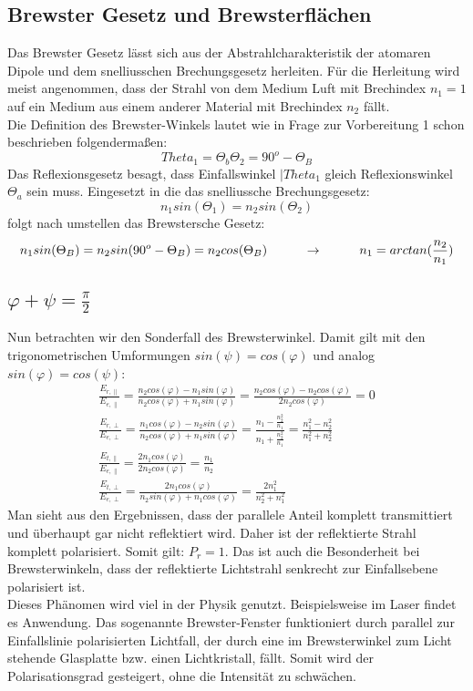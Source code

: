 \subsection*{Brewster Gesetz und Brewsterflächen}
Das Brewster Gesetz lässt sich aus der Abstrahlcharakteristik der atomaren Dipole und dem snelliusschen Brechungsgesetz herleiten. Für die Herleitung wird meist angenommen, dass der  Strahl von dem Medium Luft mit Brechindex $n_1=1$ auf ein Medium aus einem anderer Material mit Brechindex $n_2$ fällt.\\
Die Definition des Brewster-Winkels lautet wie in Frage zur Vorbereitung 1 schon beschrieben folgendermaßen:
\begin{equation}
Theta_1=\Theta_b\Theta_2=90^o-\Theta_B
\end{equation}
Das Reflexionsgesetz besagt, dass Einfallswinkel $|Theta_1$ gleich Reflexionswinkel $\Theta_a$ sein muss. 
Eingesetzt in die das snelliussche Brechungsgesetz: 
\begin{equation}
n_1sin(\Theta_1)=n_2sin(\Theta_2)
\end{equation}
folgt nach umstellen das Brewstersche Gesetz:
\begin{equation}
n_1sin(\Theta_B)=n_2sin(90^o-\Theta_B)=n_2cos(\Theta_B) \tab \rightarrow \tab n_1=arctan(\frac{n_2}{n_1})
\end{equation}

\subsection*{$\varphi+\psi=\frac{\pi}{2}$}
Nun betrachten wir den Sonderfall des Brewsterwinkel. Damit gilt mit den trigonometrischen Umformungen $sin(\psi)=cos(\varphi)$ und analog $sin(\varphi)=cos(\psi)$:
\begin{align*}
\frac{E_{r,\parallel}}{E_{e,\parallel}}=\frac{n_2cos(\varphi)-n_1sin(\varphi)}{n_2cos(\varphi)+n_1sin(\varphi)}= \frac{n_2cos(\varphi)-n_2cos(\varphi)}{2n_2cos(\varphi)}=0\\
\frac{E_{r,\perp}}{E_{e,\perp}}=\frac{n_1cos(\varphi)-n_2sin(\varphi)}{n_2cos(\varphi)+n_1sin(\varphi)}=\frac{n_1-\frac{n_2^2}{n_1}}{n_1+\frac{n_2^2}{n_1}}=\frac{n_1^2-n_2^2}{n_1^2+n_2^2}\\
\frac{E_{t,\parallel}}{E_{e,\parallel}}=\frac{2n_1cos(\varphi)}{2n_2cos(\varphi)}=\frac{n_1}{n_2}\\
\frac{E_{t,\perp}}{E_{e,\perp}}=\frac{2n_1cos(\varphi)}{n_2sin(\varphi)+n_1cos(\varphi)}=\frac{2n^2_1}{n_2^2+n_1^2}
\end{align*}
Man sieht aus den Ergebnissen, dass der parallele Anteil komplett transmittiert und überhaupt gar nicht reflektiert wird. Daher ist der reflektierte Strahl komplett polarisiert. Somit gilt: $P_r=1$. Das ist auch die Besonderheit bei Brewsterwinkeln, dass der reflektierte Lichtstrahl senkrecht zur Einfallsebene polarisiert ist. \\
Dieses Phänomen wird viel in der Physik genutzt. Beispielsweise im Laser findet es Anwendung. Das sogenannte Brewster-Fenster funktioniert durch parallel zur Einfallslinie polarisierten Lichtfall, der durch eine im Brewsterwinkel zum Licht stehende Glasplatte bzw. einen Lichtkristall, fällt. Somit wird der Polarisationsgrad gesteigert, ohne die Intensität zu schwächen.  

